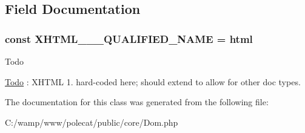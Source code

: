 \subsection{Field Documentation}
\hypertarget{class_able_polecat___dom_a9687e5f2a0ad8e40fbf6de213dc8e077}{}
\subsubsection[{X\+H\+T\+M\+L\+\_\+1\+\_\+1\+\_\+\+Q\+U\+A\+L\+I\+F\+I\+E\+D\+\_\+\+N\+A\+M\+E}]{\setlength{\rightskip}{0pt plus 5cm}const X\+H\+T\+M\+L\+\_\+\_\+\_\+\+Q\+U\+A\+L\+I\+F\+I\+E\+D\+\_\+\+N\+A\+M\+E = \textquotesingle{}html\textquotesingle{}}\label{class_able_polecat___dom_a9687e5f2a0ad8e40fbf6de213dc8e077}
\begin{DoxyRefDesc}{Todo}
\item[\hyperlink{todo__todo000003}{Todo}]\+: X\+H\+T\+M\+L 1. hard-\/coded here; should extend to allow for other doc types. \end{DoxyRefDesc}


The documentation for this class was generated from the following file\+:\begin{DoxyCompactItemize}
\item 
C\+:/wamp/www/polecat/public/core/Dom.\+php\end{DoxyCompactItemize}

